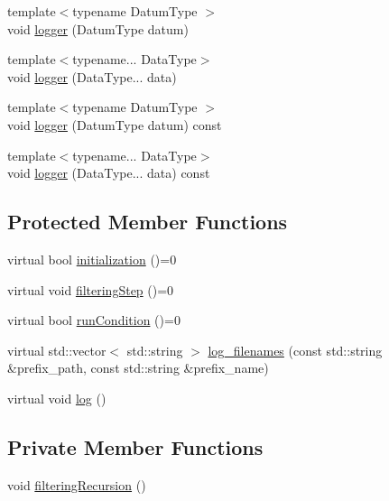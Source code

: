 \begin{DoxyCompactItemize}
{\footnotesize template$<$typename Datum\+Type $>$ }\\void \mbox{\hyperlink{classbfl_1_1Logger_a1033ff31398484f2132f84fd140da9e3}{logger}} (Datum\+Type datum)
\item 
{\footnotesize template$<$typename... Data\+Type$>$ }\\void \mbox{\hyperlink{classbfl_1_1Logger_aca2086c9256e5c404872b91f7f25b97d}{logger}} (Data\+Type... data)
\item 
{\footnotesize template$<$typename Datum\+Type $>$ }\\void \mbox{\hyperlink{classbfl_1_1Logger_a50b1c109730fa98f66e66f420f0158fe}{logger}} (Datum\+Type datum) const
\item 
{\footnotesize template$<$typename... Data\+Type$>$ }\\void \mbox{\hyperlink{classbfl_1_1Logger_a0f0cf7ce956546d94dfb1feb7cebf171}{logger}} (Data\+Type... data) const
\end{DoxyCompactItemize}
\subsection*{Protected Member Functions}
\begin{DoxyCompactItemize}
\item 
virtual bool \mbox{\hyperlink{classbfl_1_1FilteringAlgorithm_adebe2ec2372f97a2a5baecf8c2c2a9c9}{initialization}} ()=0
\item 
virtual void \mbox{\hyperlink{classbfl_1_1FilteringAlgorithm_ab3bceb43b5810a4bf1da884b8a0b145a}{filtering\+Step}} ()=0
\item 
virtual bool \mbox{\hyperlink{classbfl_1_1FilteringAlgorithm_a5fc12882356f6906b102fbfff2bc4b7c}{run\+Condition}} ()=0
\item 
virtual std\+::vector$<$ std\+::string $>$ \mbox{\hyperlink{classbfl_1_1Logger_a328ceaa8e70e6918f11142b12b8be217}{log\+\_\+filenames}} (const std\+::string \&prefix\+\_\+path, const std\+::string \&prefix\+\_\+name)
\item 
virtual void \mbox{\hyperlink{classbfl_1_1Logger_ad44f46593cb8c4c87c1178eb326e2f64}{log}} ()
\end{DoxyCompactItemize}
\subsection*{Private Member Functions}
\begin{DoxyCompactItemize}
\item 
void \mbox{\hyperlink{classbfl_1_1FilteringAlgorithm_a139fe290f73939e72c88cb43c8ef7544}{filtering\+Recursion}} ()
\end{DoxyCompactItemize}
